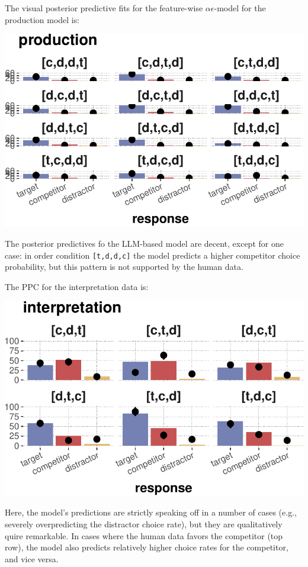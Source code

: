 \documentclass{article}
\begin{document}
The visual posterior predictive fits for the feature-wise
\(\alpha\epsilon\)-model for the production model is:

\includegraphics{00-pics/PPC-choice-1.pdf}

The posterior predictives fo the LLM-based model are decent, except for
one case: in order condition \texttt{{[}t,d,d,c{]}} the model predicts a
higher competitor choice probability, but this pattern is not supported
by the human data.

The PPC for the interpretation data is:

\includegraphics{00-pics/PPC-choice-interpretation-1.pdf}

Here, the model's predictions are strictly speaking off in a number of
cases (e.g., severely overpredicting the distractor choice rate), but
they are qualitatively quire remarkable. In cases where the human data
favors the competitor (top row), the model also predicts relatively
higher choice rates for the competitor, and vice versa.
\end{document}
